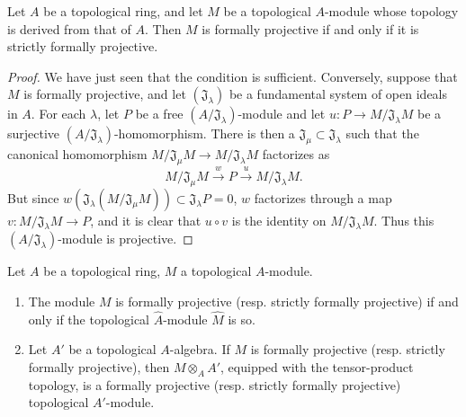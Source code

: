 \begin{proposition}[19.2.4]
\label{0.19.2.4}
Let $A$ be a topological ring, and let $M$ be a topological $A$-module whose topology is derived from that of $A$.
Then $M$ is formally projective if and only if it is strictly formally projective.
\end{proposition}


\begin{proof}
We have just seen that the condition is sufficient.
Conversely, suppose that $M$ is formally projective, and let $(\mathfrak J_\lambda)$ be a fundamental system of open ideals in $A$.
For each $\lambda$, let $P$ be a free $(A/\mathfrak J_\lambda)$-module and let $u:P\to M/\mathfrak J_\lambda M$ be a surjective $(A/\mathfrak J_\lambda)$-homomorphism.
There is then a $\mathfrak J_\mu\subset\mathfrak J_\lambda$ such that the canonical homomorphism $M/\mathfrak J_\mu M\to M/\mathfrak J_\lambda M$ factorizes as
\[
  M/\mathfrak J_\mu M\xrightarrow{w}P\xrightarrow{u}M/\mathfrak J_\lambda M.
\]
But since $w(\mathfrak J_\lambda(M/\mathfrak J_\mu M))\subset\mathfrak J_\lambda P=0$, $w$ factorizes through a map $v:M/\mathfrak J_\lambda M\to P$, and it is clear that $u\circ v$ is the identity on $M/\mathfrak J_\lambda M$.
Thus this $(A/\mathfrak J_\lambda)$-module is projective.
\end{proof}

\begin{proposition}[19.2.5]
\label{0.19.2.5}
Let $A$ be a topological ring, $M$ a topological $A$-module.
\begin{enumerate}
  \item[(i)] The module $M$ is formally projective (resp. strictly formally projective) if and only if the topological $\widehat A$-module $\widehat M$ is so.
  \item[(ii)] Let $A'$ be a topological $A$-algebra.
  If $M$ is formally projective (resp. strictly formally projective), then $M\otimes_A A'$, equipped with the tensor-product topology, is a formally projective (resp. strictly formally projective) topological $A'$-module.
\end{enumerate}
\end{proposition}


